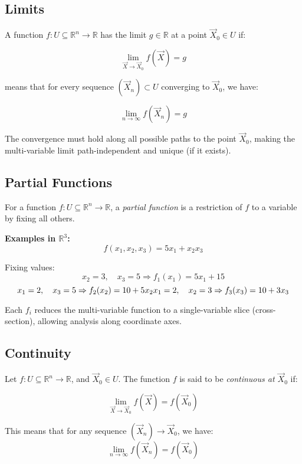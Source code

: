 \subsection{Limits}

A function \( f : U \subseteq \mathbb{R}^n \to \mathbb{R} \) has the limit \( g \in \mathbb{R} \) at a point \( \vec{X}_0 \in U \) if:

\[
\lim_{\vec{X} \to \vec{X}_0} f(\vec{X}) = g
\]

means that for every sequence \( (\vec{X}_n) \subset U \) converging to \( \vec{X}_0 \), we have:

\[
\lim_{n \to \infty} f(\vec{X}_n) = g
\]

The convergence must hold along all possible paths to the point \( \vec{X}_0 \), making the multi-variable limit path-independent and unique (if it exists).


\subsection{Partial Functions}

For a function \( f: U \subseteq \mathbb{R}^n \to \mathbb{R} \), a \emph{partial function} is a restriction of \( f \) to a variable by fixing all others.
\vspace{\baselineskip}

\textbf{Examples in \( \mathbb{R}^3 \):}
\[
f(x_1, x_2, x_3) = 5x_1 + x_2 x_3
\]

Fixing values:
\[
x_2 = 3, \quad x_3 = 5 \Rightarrow f_1(x_1) = 5x_1 + 15 
\]
\[
x_1 = 2, \quad x_3 = 5 \Rightarrow f_2(x_2) = 10 + 5x_2 \\
x_1 = 2, \quad x_2 = 3 \Rightarrow f_3(x_3) = 10 + 3x_3
\]

Each \( f_i \) reduces the multi-variable function to a single-variable slice (cross-section), allowing analysis along coordinate axes.


\subsection{Continuity}

Let \( f : U \subseteq \mathbb{R}^n \to \mathbb{R} \), and \( \vec{X}_0 \in U \). The function \( f \) is said to be \emph{continuous at \( \vec{X}_0 \)} if:

\[
\lim_{\vec{X} \to \vec{X}_0} f(\vec{X}) = f(\vec{X}_0)
\]

This means that for any sequence \( (\vec{X}_n) \to \vec{X}_0 \), we have:
\[
\lim_{n \to \infty} f(\vec{X}_n) = f(\vec{X}_0)
\]

